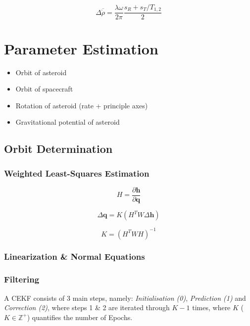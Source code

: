 \begin{equation}
    \Delta{\overline{\dot{\rho}}} = \frac{\lambda\omega}{2\pi}\frac{s_R+s_T/T_{1,2}}{2}
\end{equation}


\newpage{}

\section{Parameter Estimation}

\begin{itemize}
    \item Orbit of asteroid
    \item Orbit of spacecraft
    \item Rotation of asteroid (rate + principle axes)
    \item Gravitational potential of asteroid
\end{itemize}

\subsection{Orbit Determination}

\subsubsection{Weighted Least-Squares Estimation}

\begin{equation}
    H=\frac{\partial{\mathbf{h}}}{\partial{\mathbf{q}}}
\end{equation}

\begin{equation}
    \Delta{\mathbf{q}}=K(H^{T}W\Delta{\mathbf{h}})
\end{equation}

\begin{equation}
    K=(H^{T}WH)^{-1}
\end{equation}

\subsubsection{Linearization \& Normal Equations}

\subsubsection{Filtering}


 \noindent{}A CEKF consists of 3 main steps, namely: \textit{Initialisation (0)}, \textit{Prediction (1)} and \textit{Correction (2)}, where steps 1 \& 2 are iterated through $K-1$ times, where $K$ ($K\in\mathbb{Z}^+$) quantifies the number of Epochs.
 
